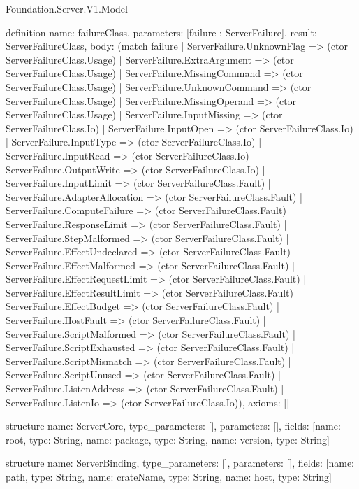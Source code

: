 \begin{lexlean}{Foundation.Server.V1.Model}
\begin{semanticmodule}
definition{
  name: failureClass,
  parameters: [failure : ServerFailure],
  result: ServerFailureClass,
  body: (match failure
    | ServerFailure.UnknownFlag => (ctor ServerFailureClass.Usage)
    | ServerFailure.ExtraArgument => (ctor ServerFailureClass.Usage)
    | ServerFailure.MissingCommand => (ctor ServerFailureClass.Usage)
    | ServerFailure.UnknownCommand => (ctor ServerFailureClass.Usage)
    | ServerFailure.MissingOperand => (ctor ServerFailureClass.Usage)
    | ServerFailure.InputMissing => (ctor ServerFailureClass.Io)
    | ServerFailure.InputOpen => (ctor ServerFailureClass.Io)
    | ServerFailure.InputType => (ctor ServerFailureClass.Io)
    | ServerFailure.InputRead => (ctor ServerFailureClass.Io)
    | ServerFailure.OutputWrite => (ctor ServerFailureClass.Io)
    | ServerFailure.InputLimit => (ctor ServerFailureClass.Fault)
    | ServerFailure.AdapterAllocation => (ctor ServerFailureClass.Fault)
    | ServerFailure.ComputeFailure => (ctor ServerFailureClass.Fault)
    | ServerFailure.ResponseLimit => (ctor ServerFailureClass.Fault)
    | ServerFailure.StepMalformed => (ctor ServerFailureClass.Fault)
    | ServerFailure.EffectUndeclared => (ctor ServerFailureClass.Fault)
    | ServerFailure.EffectMalformed => (ctor ServerFailureClass.Fault)
    | ServerFailure.EffectRequestLimit => (ctor ServerFailureClass.Fault)
    | ServerFailure.EffectResultLimit => (ctor ServerFailureClass.Fault)
    | ServerFailure.EffectBudget => (ctor ServerFailureClass.Fault)
    | ServerFailure.HostFault => (ctor ServerFailureClass.Fault)
    | ServerFailure.ScriptMalformed => (ctor ServerFailureClass.Fault)
    | ServerFailure.ScriptExhausted => (ctor ServerFailureClass.Fault)
    | ServerFailure.ScriptMismatch => (ctor ServerFailureClass.Fault)
    | ServerFailure.ScriptUnused => (ctor ServerFailureClass.Fault)
    | ServerFailure.ListenAddress => (ctor ServerFailureClass.Fault)
    | ServerFailure.ListenIo => (ctor ServerFailureClass.Io)),
  axioms: []
}

structure{
  name: ServerCore,
  type_parameters: [],
  parameters: [],
  fields: [{name: root, type: String}, {name: package, type: String}, {name: version, type: String}]
}

structure{
  name: ServerBinding,
  type_parameters: [],
  parameters: [],
  fields: [{name: path, type: String}, {name: crateName, type: String}, {name: host, type: String}]
}


\end{semanticmodule}
\end{lexlean}
